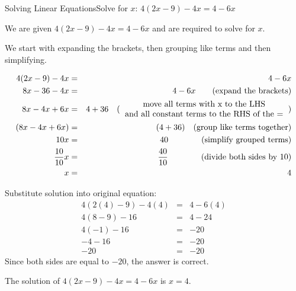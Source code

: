 \documentclass[10pt,a4paper,titlepage,twoside,openright]{report}
\begin{document}
\begin{wex}{Solving Linear Equations}{Solve for $x$: $4(2x-9)-4x=4-6x$}{
We are given $4(2x-9)-4x=4-6x$ and are required to solve for $x$.

We start with expanding the brackets, then grouping like terms and then
simplifying.

\begin{eqnarray*}
4(2x-9)-4x&=&4-6x\\
8x -36 -4x&=&4-6x\quad\quad\mbox{(expand the brackets)}\\
8x-4x+6x&=&4+36\quad\mbox{(\begin{tabular}{c}move all terms with x to the LHS \\ and all constant
terms to the RHS of the =\end{tabular})}\\
(8x-4x+6x) &=& (4+36)\quad\mbox{(group like terms together)}\\
10x&=&40\quad\quad\quad\quad\mbox{(simplify grouped terms)}\\
\frac{10}{10}x&=&\frac{40}{10}\quad\quad\quad\quad\mbox{(divide both sides by
10)}\\
x&=&4
\end{eqnarray*}

Substitute solution into original equation:
\begin{eqnarray*}
4(2(4)-9)-4(4)&=&4-6(4)\\
4(8-9)-16&=&4-24\\
4(-1)-16&=&-20\\
-4-16&=&-20\\
-20&=&-20
\end{eqnarray*}
Since both sides are equal to $-20$, the answer is correct.


The solution of $4(2x-9)-4x=4-6x$ is $x=4$.}
\end{wex}
\end{document}
